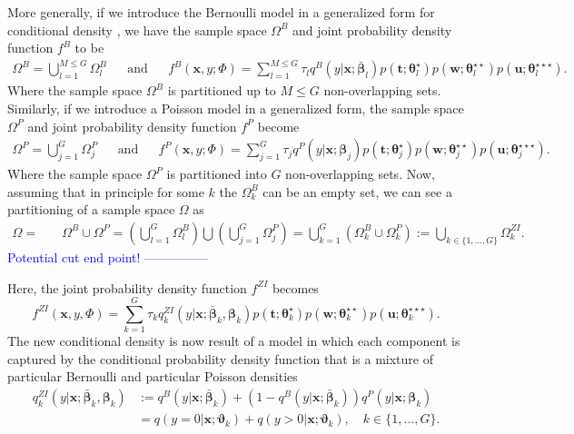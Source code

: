 \documentclass[12pt,letterpaper]{article}
\numberwithin{equation}{section}
\numberwithin{equation}{section}
\numberwithin{equation}{section}
\begin{document}
	 More generally, if we introduce the Bernoulli model in a generalized form for conditional density \citep[see][]{Ingrassia+Punzo+Vittadini+Minotti:2015}, we have the sample space $\Omega^B$ and joint probability density function $f^B$ to be \begin{align*}
\Omega^B =  \bigcup_{l =1}^{M \leq G}  \Omega_l^B & & \text{and} &  &
f^B(\bm x, y; \Phi)= \sum_{l=1}^{M \leq G} \tau_l q^B(y|\bm{x}; \bm{\bar{\beta}}_l) p(\bm{t};\bm{\theta}_l^{\star})p(\bm{w};\bm{\theta}_l^{\star\star})p(\bm{u};\bm{\theta}_l^{\star\star\star}).
\end{align*}
Where the sample space $\Omega^B$ is partitioned up to $M \leq G$ non-overlapping sets.
Similarly, if we introduce a Poisson model in a generalized form, the sample space $\Omega^P$ and joint probability density function $f^P$ become
\begin{align*}
\Omega^P =  \bigcup_{j =1}^{G} \Omega_j^P & & \text{and} &  &
f^P(\bm x, y; \Phi)= \sum_{j=1}^{G} \tau_j q^P(y|\bm{x};\bm{\beta}_{j}) p(\bm{t};\bm{\theta}_j^{\star})p(\bm{w};\bm{\theta}_j^{\star\star})p(\bm{u};\bm{\theta}_j^{\star\star\star}).
\end{align*}
Where the sample space $\Omega^P$ is partitioned into  $G$ non-overlapping sets.
 Now, assuming that in principle for some $k$ the $\Omega_k^B$ can be an empty set, we can see a partitioning of a sample space $\Omega$ as
 \begin{align*}
  \Omega = & \quad \Omega^B \cup \Omega^P  =  \left(  \bigcup_{l=1}^{G} \Omega^B_l \right) \bigcup \left( \bigcup_{j=1}^G \Omega^P_j  \right) = \bigcup^G_{k = 1} \left(\Omega_k^B \cup \Omega_k^P \right) :=  \bigcup_{k \in \{ 1, ..., G  \} } \Omega_k^{ZI}.
 \end{align*}
 \textcolor{blue}{Potential cut end point! ---------------}
 
Here, the joint probability density function $f^{ZI}$ becomes
 $$f^{ZI}(\bm{x},y,\Phi) = \sum_{k=1}^{G} \tau_k q^{ZI}_{k}(y|\bm{x};  \bm{\bar{\beta}}_k,\bm{ \beta}_k)  p(\bm{t};\bm{\theta}_k^{\star})p(\bm{w};\bm{\theta}_k^{\star\star})p(\bm{u};\bm{\theta}_k^{\star\star\star}). $$  
 The new conditional density is now result of a model in which each component is captured by the conditional probability density function that is a mixture of particular Bernoulli and particular Poisson densities
\begin{align}
q^{ZI}_{k}(y|\bm{x};  \bm{\bar{\beta}}_k,\bm{ \beta}_k) & := q^B(y|\bm{x}; \bm{\bar{\beta}}_k) +(1-  q^B(y|\bm{x}; \bm{\bar{\beta}}_k) ) q^P(y|\bm{x};\bm{\beta}_k) \nonumber \\
& = q(y = 0|\bm{x};\bm{\vartheta}_{k} ) +  q(y > 0|\bm{x} ; \bm{\vartheta}_{k}), \quad k \in \{ 1, ..., G  \}.
\label{ziGCWM}
\end{align}
\end{document}
